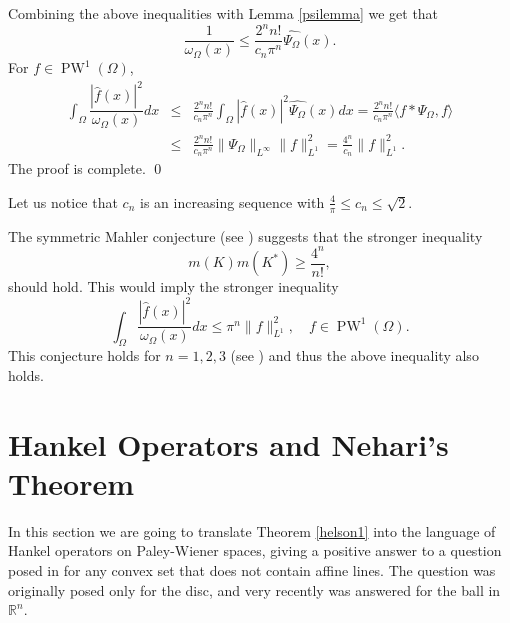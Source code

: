 \documentclass{amsart}
\theoremstyle{plain}
\DeclareMathOperator{\PW}{PW}
\begin{document}
Combining the above inequalities with Lemma \ref{psilemma} we get that
$$\frac{1}{\omega_\Omega(x)}\leq \frac{2^nn!}{c_n\pi^n}\widehat{\Psi_\Omega}(x).$$
For $f\in \PW^1(\Omega)$,
\begin{eqnarray} \int_\Omega\dfrac{|\hat{f}(x)|^2}{\omega_\Omega(x)}dx &\leq& \frac{2^nn!}{c_n\pi^n} \int_\Omega|\hat{f}(x)|^2\widehat{\Psi_\Omega}(x)dx =  \frac{2^nn!}{c_n\pi^n} \langle f\ast \Psi_\Omega,f\rangle \nonumber \\
	&\leq&\frac{2^nn!}{c_n\pi^n} \|\Psi_\Omega\|_{L^\infty}\|f\|_{L^1}^2=\frac{4^n}{c_n}\|f\|_{L^1}^2. \nonumber 
\end{eqnarray}
The proof is complete. \qed


Let us notice that $c_n$ is an increasing sequence with $\frac{4}{\pi}\leq c_n\leq \sqrt{2}$.


The symmetric Mahler conjecture (see \cite{Mahler1939,FradeliziMeyerZvavitch2023}) suggests that the stronger inequality 
$$m(K)m(K^\ast)\geq \frac{4^n}{n!},$$ should hold. This would imply the stronger inequality  $$\int_{\Omega}\dfrac{|\hat{f}(x)|^2}{\omega_\Omega(x)}dx\leq \pi^n\|f\|_{L^1}^2, \quad f\in\PW^1(\Omega).$$ 
This conjecture holds for $n=1,2,3$ (see \cite{Mahler1939Minimal,IriyehShibata2020}) and thus the above inequality also holds.


\section{Hankel Operators and Nehari's Theorem}\label{sec3}
In this section we are going to translate Theorem \ref{helson1} into the language of Hankel operators on Paley-Wiener spaces, giving a positive answer to a question posed in \cite{MR4502777} for any convex set that does not contain affine lines. The question was originally posed only for the disc, and very recently was answered for the ball in $\mathbb{R}^n$.
\end{document}
